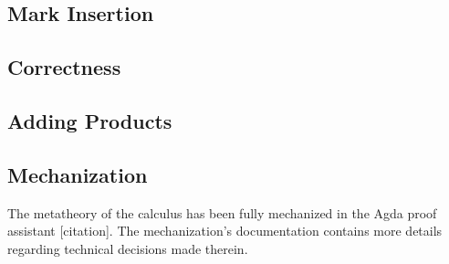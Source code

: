 \subsection{Mark Insertion}
\label{sec:calculus-marking}

\subsection{Correctness}
\label{sec:calculus-correctness}




\subsection{Adding Products}
\label{sec:calculus-products}

\subsection{Mechanization}
\label{sec:calculus-agda}

The metatheory of the calculus has been fully mechanized in the Agda proof assistant [citation]. The
mechanization's documentation contains more details regarding technical decisions made therein.
